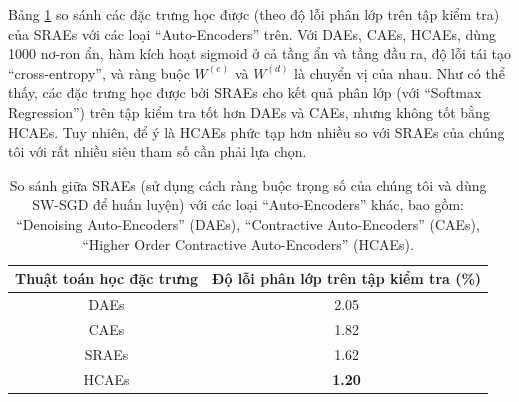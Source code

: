 Bảng \ref{table_SRAEsVSOtherAEs} so sánh các đặc trưng học được (theo độ lỗi phân lớp trên tập kiểm tra) của SRAEs với các loại ``Auto-Encoders'' trên. Với DAEs, CAEs, HCAEs, \cite{rifai2011HCAEs} dùng 1000 nơ-ron ẩn, hàm kích hoạt sigmoid ở cả tầng ẩn và tầng đầu ra, độ lỗi tái tạo ``cross-entropy'', và ràng buộc $W^{(e)}$ và $W^{(d)}$ là chuyển vị của nhau. Như có thể thấy, các đặc trưng học được bởi SRAEs cho kết quả phân lớp (với ``Softmax Regression'') trên tập kiểm tra tốt hơn DAEs và CAEs, nhưng không tốt bằng HCAEs. Tuy nhiên, để ý là HCAEs phức tạp hơn nhiều so với SRAEs của chúng tôi với rất nhiều siêu tham số cần phải lựa chọn.
\begin{table}
	\centering
	\caption[So sánh giữa SRAEs với các loại ``Auto-Encoders'' khác]{So sánh giữa SRAEs (sử dụng cách ràng buộc trọng số của chúng tôi và dùng SW-SGD để huấn luyện) với các loại ``Auto-Encoders'' khác, bao gồm: ``Denoising Auto-Encoders'' (DAEs), ``Contractive Auto-Encoders'' (CAEs), ``Higher Order Contractive Auto-Encoders'' (HCAEs).}
	\label{table_SRAEsVSOtherAEs}
	\begin{tabular}{|c|c|} \hline
		\textbf{Thuật toán học đặc trưng} & \textbf{Độ lỗi phân lớp trên tập kiểm tra (\%)}\\ \hline\hline
		DAEs \cite{rifai2011HCAEs} & 2.05\\ \hline
		CAEs \cite{rifai2011HCAEs} & 1.82\\ \hline
		SRAEs & 1.62\\ \hline
		HCAEs \cite{rifai2011HCAEs} & \textbf{1.20}\\ \hline
	\end{tabular}
\end{table}